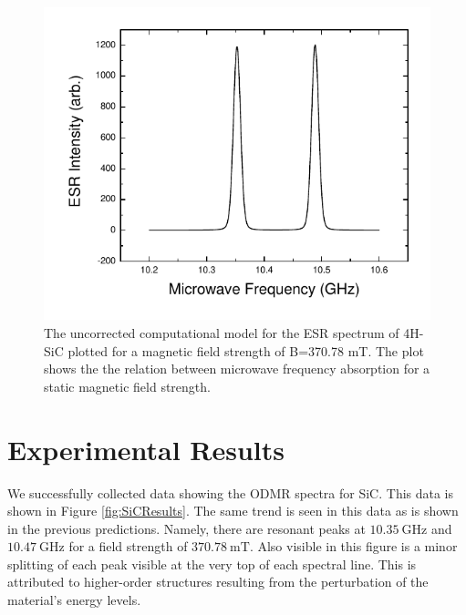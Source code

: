 \documentclass[oneside]{BYUPhys}
\begin{document}
\begin{figure}[H]
    \centerline{\includegraphics{p14-esr-uncorrected}}
    \caption[ESR Computational Model for SiC]{\label{fig:SiCModel}
     The uncorrected computational model for the ESR spectrum of 4H-SiC plotted for a magnetic field strength of B=370.78 mT. The plot shows the the relation between microwave frequency absorption for a static magnetic field strength.}
 \end{figure}

\section{Experimental Results}

We successfully collected data showing the ODMR spectra for SiC. This data is shown in Figure \ref{fig:SiCResults}. The same trend is seen in this data as is shown in the previous predictions. Namely, there are resonant peaks at $10.35~\text{GHz}$ and $10.47~\text{GHz}$ for a field strength of $370.78~\text{mT}$. Also visible in this figure is a minor splitting of each peak visible at the very top of each spectral line. This is attributed to higher-order structures resulting from the perturbation of the material's energy levels.
\end{document}
